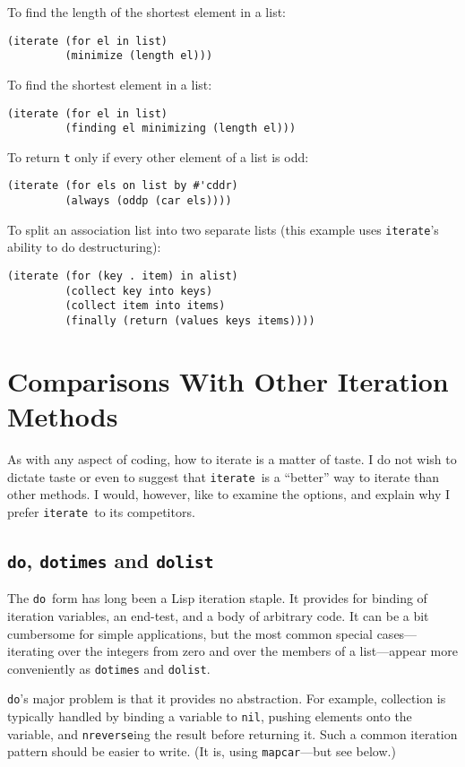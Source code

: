 \documentclass[12pt]{article}
\newcommand{\lisp}{\tt}
\newcommand{\iter}{{\lisp iterate}}
\newcommand{\Do}{{\lisp do}}
\begin{document}
\pagebreak[2]
To find the length of the shortest element in a list:
\begin{verbatim}
(iterate (for el in list)
         (minimize (length el)))
\end{verbatim}

\pagebreak[2]
To find the shortest element in a list:
\begin{verbatim}
(iterate (for el in list)
         (finding el minimizing (length el)))
\end{verbatim}

\pagebreak[2]
To return {\lisp t} only if every other element of a list is odd:
\begin{verbatim}
(iterate (for els on list by #'cddr)
         (always (oddp (car els))))
\end{verbatim}

\pagebreak[2]
To split an association list into two separate lists (this example
uses \iter's ability to do destructuring):
\begin{verbatim}
(iterate (for (key . item) in alist)
         (collect key into keys)
         (collect item into items)
         (finally (return (values keys items))))
\end{verbatim}


\section{Comparisons With Other Iteration Methods}

As with any aspect of coding, how to iterate is a matter of taste.  I
do not wish to dictate taste or even to suggest that \iter\ is a
``better'' way to iterate than other methods.  I would, however, like
to examine the options, and explain why I prefer \iter\ to its
competitors.

\subsection{\Do, {\lisp dotimes} and {\lisp dolist}}

The \Do\ form has long been a Lisp iteration staple.  It provides for
binding of iteration variables, an end-test, and a body of arbitrary
code.  It can be a bit cumbersome for simple applications, but
the most common special cases---iterating over the integers
from zero and over the members of a list---appear more conveniently as
{\lisp dotimes} and {\lisp dolist}.

\Do's major problem is that it provides no abstraction.  For example,
collection is typically handled by binding a variable to {\lisp nil},
pushing elements onto the variable, and {\lisp nreverse}ing the
result before returning it.  Such a common iteration pattern should be
easier to write.  (It is, using {\lisp mapcar}---but see below.)
\end{document}
